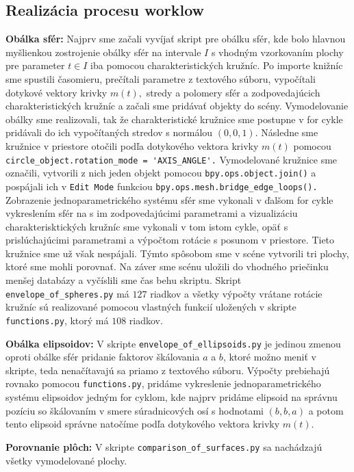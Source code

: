 \subsection{Realizácia procesu worklow}
\noindent \textbf{Obálka sfér:}
Najprv sme začali vyvíjať skript pre obálku sfér, kde bolo hlavnou myšlienkou zostrojenie obálky sfér na intervale $I$ s vhodným vzorkovaním plochy pre parameter $t \in I$ iba pomocou charakteristických kružníc. Po importe knižníc sme spustili časomieru, prečítali parametre z textového súboru, vypočítali dotykové vektory krivky $m(t),$ stredy a polomery sfér a zodpovedajúcich charakteristických kružníc a začali sme pridávať objekty do scény. 
Vymodelovanie obálky sme realizovali, tak že charakteristické kružnice sme postupne v for cykle pridávali do ich vypočítaných stredov s normálou $(0,0,1).$ Následne sme kružnice v priestore otočili podľa dotykového vektora krivky $m(t)$ pomocou \verb|circle_object.rotation_mode = 'AXIS_ANGLE'.| Vymodelované kružnice sme označili, vytvorili z nich jeden objekt pomocou \verb|bpy.ops.object.join()| a pospájali ich v \verb|Edit Mode| funkciou \verb|bpy.ops.mesh.bridge_edge_loops().| Zobrazenie jednoparametrického systému sfér sme vykonali v ďalšom for cykle vykreslením sfér na s im zodpovedajúcimi parametrami a vizualizáciu charakterisktických kružníc sme vykonali v tom istom cykle, opäť s prislúchajúcimi parametrami a výpočtom rotácie s posunom v priestore. Tieto kružnice sme už však nespájali. Týmto spôsobom sme v scéne vytvorili tri plochy, ktoré sme mohli porovnať. Na záver sme scénu uložili do vhodného priečinku menšej databázy a vyčíslili sme čas behu skriptu. Skript \verb|envelope_of_spheres.py| má $127$ riadkov a všetky výpočty vrátane rotácie kružníc sú realizované pomocou vlastných funkcií uložených v skripte \verb|functions.py|, ktorý má $108$ riadkov.

\noindent \textbf{Obálka elipsoidov:}
V skripte \verb|envelope_of_ellipsoids.py| je jedinou zmenou oproti obálke sfér pridanie faktorov škálovania $a$ a $b$, ktoré možno meniť v skripte, teda nenačítavajú sa priamo z textového súboru. Výpočty prebiehajú rovnako pomocou \verb|functions.py|, pridáme vykreslenie jednoparametrického systému elipsoidov jedným for cyklom, kde najprv pridáme elipsoid na správnu pozíciu so škálovaním v smere súradnicových osí s hodnotami $(b, b, a)$ a potom tento elipsoid správne natočíme podľa dotykového vektora krivky $m(t).$ 

\noindent \textbf{Porovnanie plôch:}
V skripte \verb|comparison_of_surfaces.py| sa nachádzajú všetky vymodelované plochy.

